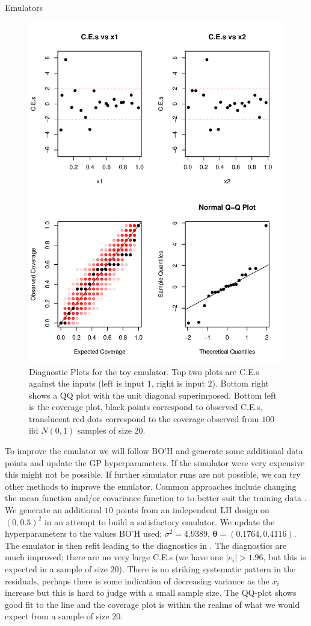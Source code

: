 \begin{chapter}{Emulators \label{Ch:Emulators}}
\begin{figure}[H]
   \includegraphics{fig-emulators/diags.pdf}
   \caption{Diagnostic Plots for the toy emulator. Top two plots are C.E.s against the inputs (left is input $1$, right is input $2$). Bottom right shows a QQ plot with the unit diagonal superimposed. Bottom left is the coverage plot, black points correspond to observed C.E.s, translucent red dots correspond to the coverage observed from $100$ iid $N(0,1)$ samples of size $20$.}
   \label{Fig:diags}
 \end{figure}
To improve the emulator we will follow BO'H and generate some additional data points and update the GP hyperparameters. If the simulator were very expensive this might not be possible. If further simulator runs are not possible, we can try other methods to improve the emulator. Common approaches include changing the mean function and/or covariance function to to better suit the training data \citep{Overstall2017, Volodina2020}.
We generate an additional $10$ points from an independent LH design on $(0, 0.5)^2$ in an attempt to build a satisfactory emulator. We update the hyperparameters to the values BO'H used; $\sigma^2 = 4.9389$, $\bm{\theta} =  (0.1764, 0.4116)$. The emulator is then refit leading to the diagnostics in . The diagnostics are much improved; there are no very large C.E.s (we have one $|e_i|>1.96$, but this is expected in a sample of size $20$). There is no striking systematic pattern in the residuals, perhaps there is some indication of decreasing variance as the $x_i$ increase but this is hard to judge with a small sample size. The QQ-plot shows good fit to the line and the coverage plot is within the realms of what we would expect from a sample of size $20$.

\end{chapter}
